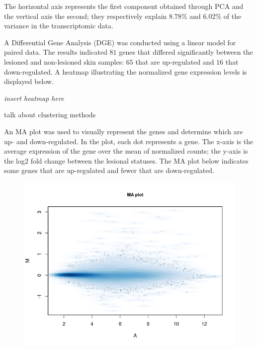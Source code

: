\documentclass[journal, a4paper]{IEEEtran}
\begin{document}
The horizontal axis represents the first component obtained through PCA and the vertical axis the second; they respectively explain $8.78\%$ and $6.02\%$ of the variance in the transcriptomic data.

A Differential Gene Analysis (DGE) was conducted using a linear model for paired data. The results indicated $81$ genes that differed significantly between the lesioned and non-lesioned skin samples: $65$ that are up-regulated and $16$ that down-regulated. A heatmap illustrating the normalized gene expression levels is displayed below.

\textit{insert heatmap here}

talk about clustering methods

An MA plot was used to visually represent the genes and determine which are up- and down-regulated. In the plot, each dot represents a gene. The x-axis is the average expression of the gene over the mean of normalized counts; the y-axis is the log2 fold change between the lesional statuses. The MA plot below indicates some genes that are up-regulated and fewer that are down-regulated. 

\begin{figure}[!htp]
  \begin{center}
    \begin{minipage}{0.5 \textwidth}
      \centering
      \includegraphics[width=\textwidth]{../analysis/MA-plot-AD-paired-design.png}
      \label{MA}
    \end{minipage}
  \end{center}
\end{figure}
\end{document}
